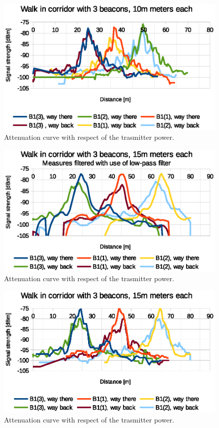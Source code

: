 \documentclass[../main.tex]{subfiles}
\begin{document}
\begin{figure}[ht]
\includegraphics[width=\textwidth, keepaspectratio]{pictures/tests_case10_walk_10m_raw}
\centering
\caption{Attenuation curve with respect of the trasmitter power.}
\label{fig:tests_case10_walk_10m_raw}
\end{figure}

\begin{figure}[ht]
\includegraphics[width=\textwidth, keepaspectratio]{pictures/tests_case10_walk_15m_low_pass}
\centering
\caption{Attenuation curve with respect of the trasmitter power.}
\label{fig:tests_case10_walk_15m_low_pass}
\end{figure}

\begin{figure}[ht]
\includegraphics[width=\textwidth, keepaspectratio]{pictures/tests_case10_walk_15m_raw}
\centering
\caption{Attenuation curve with respect of the trasmitter power.}
\label{fig:tests_case10_walk_15m_raw}
\end{figure}
\end{document}
